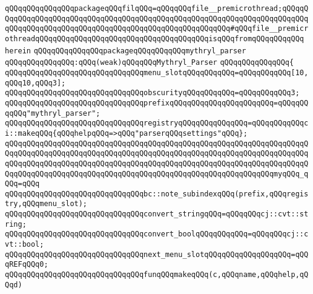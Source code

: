 \verb|qQQqqQQqqQQqqQQqpackageqQQqfilqQQq=qQQqqQQqfile__premicrothread;qQQqqQQqqQQqqQQqqQQqqQQqqQQqqQQqqQQqqQQqqQQqqQQqqQQqqQQqqQQqqQQqqQQqqQQqqQQqqQQqqQQqqQQqqQQqqQQqqQQqqQQqqQQqqQQqqQQqqQQqqQQqqQQq#qQQqfile__premicrothreadqQQqqQQqqQQqqQQqqQQqqQQqqQQqqQQqqQQqqQQqisqQQqfromqQQqqQQqqQQq|\newline
\verb|herein|\newline
\newline
\verb|qQQqqQQqqQQqqQQqpackageqQQqqQQqqQQqmythryl_parser|\newline
\verb|qQQqqQQqqQQqqQQq:qQQq(weak)qQQqqQQqMythryl_Parser|\newline
\verb|qQQqqQQqqQQqqQQq{|\newline
\verb|qQQqqQQqqQQqqQQqqQQqqQQqqQQqqQQqmenu_slotqQQqqQQqqQQq=qQQqqQQqqQQq[10,qQQq10,qQQq3];|\newline
\verb|qQQqqQQqqQQqqQQqqQQqqQQqqQQqqQQqobscurityqQQqqQQqqQQq=qQQqqQQqqQQq3;|\newline
\verb|qQQqqQQqqQQqqQQqqQQqqQQqqQQqqQQqprefixqQQqqQQqqQQqqQQqqQQqqQQq=qQQqqQQqqQQq"mythryl_parser";|\newline
\newline
\verb|qQQqqQQqqQQqqQQqqQQqqQQqqQQqqQQqregistryqQQqqQQqqQQqqQQq=qQQqqQQqqQQqci::makeqQQq{qQQqhelpqQQq=>qQQq"parserqQQqsettings"qQQq};|\newline
\verb|qQQqqQQqqQQqqQQqqQQqqQQqqQQqqQQqqQQqqQQqqQQqqQQqqQQqqQQqqQQqqQQqqQQqqQQqqQQqqQQqqQQqqQQqqQQqqQQqqQQqqQQqqQQqqQQqqQQqqQQqqQQqqQQqqQQqqQQqqQQqqQQqqQQqqQQqqQQqqQQqqQQqqQQqqQQqqQQqqQQqqQQqqQQqqQQqqQQqqQQqqQQqqQQqqQQqqQQqqQQqqQQqqQQqqQQqqQQqqQQqqQQqqQQqqQQqqQQqqQQqqQQqqQQqqQQqmyqQQq_qQQq=qQQq|\newline
\verb|qQQqqQQqqQQqqQQqqQQqqQQqqQQqqQQqbc::note_subindexqQQq(prefix,qQQqregistry,qQQqmenu_slot);|\newline
\newline
\verb|qQQqqQQqqQQqqQQqqQQqqQQqqQQqqQQqconvert_stringqQQq=qQQqqQQqcj::cvt::string;|\newline
\verb|qQQqqQQqqQQqqQQqqQQqqQQqqQQqqQQqconvert_boolqQQqqQQqqQQq=qQQqqQQqcj::cvt::bool;|\newline
\newline
\verb|qQQqqQQqqQQqqQQqqQQqqQQqqQQqqQQqnext_menu_slotqQQqqQQqqQQqqQQqqQQq=qQQqREFqQQq0;|\newline
\newline
\verb|qQQqqQQqqQQqqQQqqQQqqQQqqQQqqQQqfunqQQqmakeqQQq(c,qQQqname,qQQqhelp,qQQqd)|\newline
